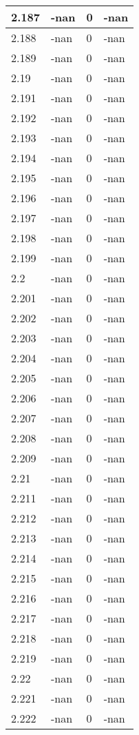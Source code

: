 \documentclass[a4paper,14pt]{extarticle}
\begin{document}
\begin{longtable}{||m{3cm}||m{3cm}|m{3cm}||m{3cm}||}
\hline
2.187 & -nan & 0 & -nan\\
\hline
2.188 & -nan & 0 & -nan\\
\hline
2.189 & -nan & 0 & -nan\\
\hline
2.19 & -nan & 0 & -nan\\
\hline
2.191 & -nan & 0 & -nan\\
\hline
2.192 & -nan & 0 & -nan\\
\hline
2.193 & -nan & 0 & -nan\\
\hline
2.194 & -nan & 0 & -nan\\
\hline
2.195 & -nan & 0 & -nan\\
\hline
2.196 & -nan & 0 & -nan\\
\hline
2.197 & -nan & 0 & -nan\\
\hline
2.198 & -nan & 0 & -nan\\
\hline
2.199 & -nan & 0 & -nan\\
\hline
2.2 & -nan & 0 & -nan\\
\hline
2.201 & -nan & 0 & -nan\\
\hline
2.202 & -nan & 0 & -nan\\
\hline
2.203 & -nan & 0 & -nan\\
\hline
2.204 & -nan & 0 & -nan\\
\hline
2.205 & -nan & 0 & -nan\\
\hline
2.206 & -nan & 0 & -nan\\
\hline
2.207 & -nan & 0 & -nan\\
\hline
2.208 & -nan & 0 & -nan\\
\hline
2.209 & -nan & 0 & -nan\\
\hline
2.21 & -nan & 0 & -nan\\
\hline
2.211 & -nan & 0 & -nan\\
\hline
2.212 & -nan & 0 & -nan\\
\hline
2.213 & -nan & 0 & -nan\\
\hline
2.214 & -nan & 0 & -nan\\
\hline
2.215 & -nan & 0 & -nan\\
\hline
2.216 & -nan & 0 & -nan\\
\hline
2.217 & -nan & 0 & -nan\\
\hline
2.218 & -nan & 0 & -nan\\
\hline
2.219 & -nan & 0 & -nan\\
\hline
2.22 & -nan & 0 & -nan\\
\hline
2.221 & -nan & 0 & -nan\\
\hline
2.222 & -nan & 0 & -nan\\

\end{longtable}
\end{document}
